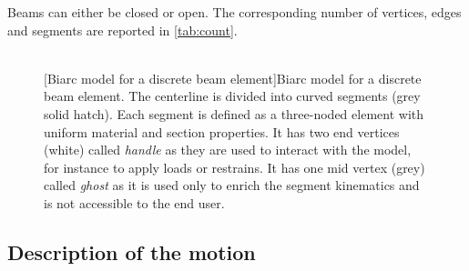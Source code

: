 Beams can either be closed or open. The corresponding number of vertices, edges and segments are reported in \cref{tab:count}.
\begin{figure}[p]
\begin{fullpage}
	\captionsetup[subfloat]{captionskip=20pt}
     	\centering
     	 \\
	\vspace{30pt}
	\vspace{10pt}
	[Biarc model for a discrete beam element]{Biarc model for a discrete beam element. The centerline is divided into curved segments (grey solid hatch). Each segment is defined as a three-noded element with uniform material and section properties. It has two end vertices (white) called \emph{handle} as they are used to interact with the model, for instance to apply loads or restrains. It has one mid vertex (grey) called \emph{ghost} as it is used only to enrich the segment kinematics and is not accessible to the end user.}
\end{fullpage}
\end{figure}

\subsection{Description of the motion}

